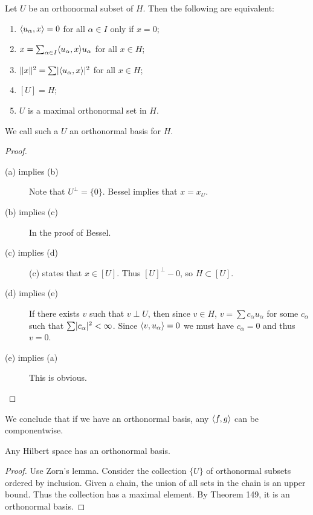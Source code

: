 \documentclass[10pt, twoside]{article}
\begin{document}
    \begin{thm} Let $U$ be an orthonormal subset of $H$. Then the following are
        equivalent: \begin{enumerate}[label=(\alph*)] \item $\langle u_{\alpha},x\rangle
            = 0$ for all $\alpha \in I$ only if $x=0$; \item $x = \sum_{\alpha
            \in I} \langle u_{\alpha},x\rangle u_{\alpha}$ for all $x \in H$; \item
    $\lVert x\rVert^2 = \sum \lvert\langle u_{\alpha},x\rangle\rvert^2$ for all $x \in H$; \item
    $[U] = H$; \item $U$ is a maximal orthonormal set in $H$.  \end{enumerate}
    We call such a $U$ an orthonormal basis for $H$.  \begin{proof}
        \begin{description} \item[(a) implies (b)] Note that $U^{\perp} =
            \{0\}$. Bessel implies that $x=x_U$.  \item[(b) implies (c)] In the
            proof of Bessel.  \item[(c) implies (d)] (c) states that $x \in
            [U]$. Thus $[U]^{\perp} - 0$, so $H \subset [U]$.  \item[(d)
            implies (e)] If there exists $v$ such that $v \perp U$, then since
            $v \in H$, $v= \sum c_{\alpha} u_{\alpha}$ for some $c_{\alpha}$
            such that $\sum \lvert c_{\alpha}\rvert^2 < \infty$. Since
            $\langle v,u_{\alpha}\rangle = 0$ we must have $c_{\alpha} = 0$ and thus
            $v=0$.  \item[(e) implies (a)] This is obvious.  \end{description}
        \end{proof} \end{thm}

    We conclude that if we have an orthonormal basis, any $\langle f,g\rangle$ can be
    componentwise.

    \begin{thm} Any Hilbert space has an orthonormal basis.  \begin{proof} Use
        Zorn's lemma. Consider the collection $\{U\}$ of orthonormal subsets
        ordered by inclusion. Given a chain, the union of all sets in the chain
        is an upper bound. Thus the collection has a maximal element. By
        Theorem 149, it is an orthonormal basis.  \end{proof} \end{thm}
\end{document}
